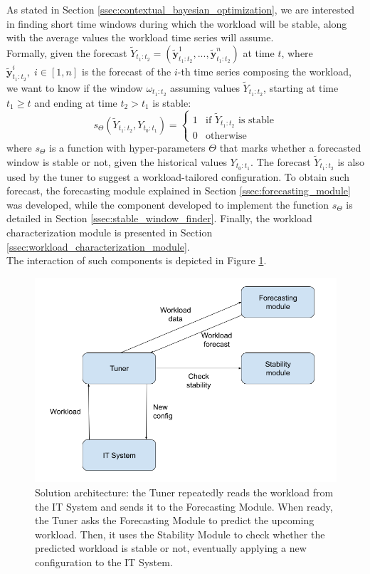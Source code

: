 \documentclass[a4paper, 12pt]{article} %
\begin{document}
	As stated in Section \ref{ssec:contextual_bayesian_optimization}, we are interested in finding short time windows during which the workload will be stable, along with the average values the workload time series will assume. \\
	Formally, given the forecast $\tilde{Y}_{t_1:t_2} = (\tilde{\pmb{y}}_{t_1:t_2}^1, ..., \tilde{\pmb{y}}_{t_1:t_2}^n)$ at time $t$, where $\tilde{\pmb{y}}_{t_1:t_2}^i, \; i\in [1, n]$ is the forecast of the $i$-th time series composing the workload, we want to know if the window $\omega_{t_1:t_2}$ assuming values $\tilde{Y}_{t_1:t_2}$, starting at time $t_1 \geq t$ and ending at time $t_2 > t_1$ is stable: 
	\begin{equation}
		s_\Theta(\tilde{Y}_{t_1:t_2}, Y_{t_0:t_1}) = \begin{cases}
			1 & \text{if $\tilde{Y}_{t_1:t_2}$ is stable}\\
			0 & \text{otherwise}
		\end{cases}    
	\end{equation}
	where $s_\Theta$ is a function with hyper-parameters $\Theta$ that marks whether a forecasted window is stable or not, given the historical values $Y_{t_0:t_1}$. The forecast $\tilde{Y}_{t_1:t_2}$ is also used by the tuner to suggest a workload-tailored configuration.
	To obtain such forecast, the forecasting module explained in Section \ref{ssec:forecasting_module} was developed, while the component developed to implement the function $s_\Theta$ is detailed in Section \ref{ssec:stable_window_finder}. Finally, the workload characterization module is presented in Section \ref{ssec:workload_characterization_module}. \\
	The interaction of such components is depicted in Figure \ref{fig:modules_interaction}.
	\begin{figure}[!hb] \centering
		\includegraphics[width=\linewidth]{img/modules_interaction.png}
		\caption{Solution architecture: the Tuner repeatedly reads the workload from the IT System and sends it to the Forecasting Module. When ready, the Tuner asks the Forecasting Module to predict the upcoming workload. Then, it uses the Stability Module to check whether the predicted workload is stable or not, eventually applying a new configuration to the IT System. }
		\label{fig:modules_interaction}
	\end{figure}
	
\end{document}
